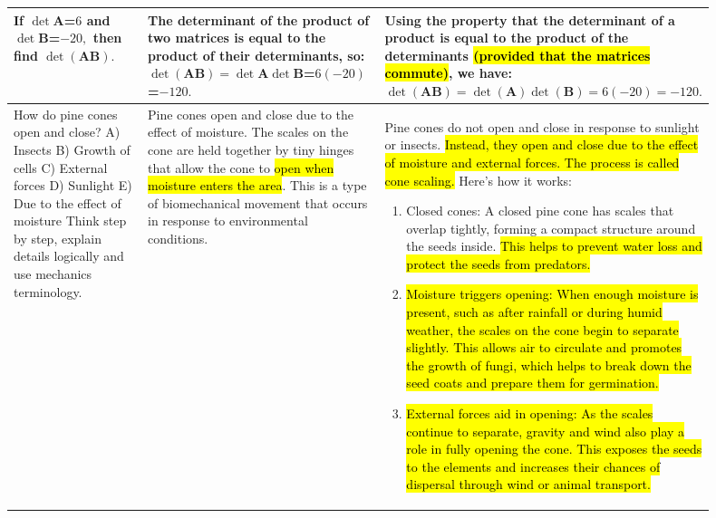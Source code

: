 \documentclass{article}
\newcommand{\redhighlight}[1]{{\sethlcolor{red}\hl{#1}}}
\begin{document}
\begin{longtable}{|p{0.2\linewidth}|p{0.35\linewidth}|p{0.35\linewidth}|}
\\ \hline
If $\det \mathbf{A}$=$ 6$ and $\det \mathbf{B} $=$ -20,$ then find $\det (\mathbf{A} \mathbf{B}).$ & The determinant of the product of two matrices is equal to the product of their determinants, so:
$\det(\mathbf{A}\mathbf{B}) = \det\mathbf{A}\det\mathbf{B} $=$ 6(-20) $=$ -120.$ & Using the property that the determinant of a product is equal to the product of the determinants \redhighlight{(provided that the matrices commute)}, we have:
\newline\newline
$\det(\mathbf{AB}) = \det(\mathbf{A})\det(\mathbf{B}) = 6(-20) = -120.$
\\ \hline
How do pine cones open and close? 
\newline\newline
A) Insects B) Growth of cells C) External forces D) Sunlight E) Due to the effect of moisture 
\newline\newline
Think step by step, explain details logically and use mechanics terminology. & Pine cones open and close due to the effect of moisture. The scales on the cone are held together by tiny hinges that allow the cone to \redhighlight{open when moisture enters the area}. This is a type of biomechanical movement that occurs in response to environmental conditions. & Pine cones do not open and close in response to sunlight or insects. \redhighlight{Instead, they open and close due to the effect of moisture and external forces. The process is called cone scaling.}
\newline\newline
Here's how it works:
\begin{enumerate}[leftmargin=*,align=left]
\item   Closed cones: A closed pine cone has scales that overlap tightly, forming a compact structure around the seeds inside. \redhighlight{This helps to prevent water loss and protect the seeds from predators.}
\item \redhighlight{Moisture triggers opening: When enough moisture is present, such as after rainfall or during humid weather, the scales on the cone begin to separate slightly. This allows air to circulate and promotes the growth of fungi, which helps to break down the seed coats and prepare them for germination.}
\item \redhighlight{External forces aid in opening: As the scales continue to separate, gravity and wind also play a role in fully opening the cone. This exposes the seeds to the elements and increases their chances of dispersal through wind or animal transport.}

\end{enumerate}
\end{longtable}
\end{document}
